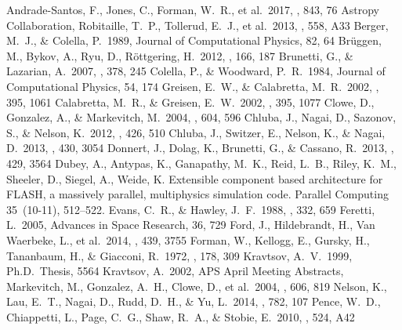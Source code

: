 \documentclass{emulateapj}
\begin{document}
\begin{thebibliography}{}
 Andrade-Santos, F., Jones, C., Forman, W.~R., et al.\ 2017, \apj, 843, 76 
 Astropy Collaboration, Robitaille, T.~P., Tollerud, E.~J., et al.\ 2013, \aap, 558, A33
 Berger, M.~J., \& Colella, P.\ 1989, Journal of Computational Physics, 82, 64
 Br{\"u}ggen, M., Bykov, A., Ryu, D., R{\"o}ttgering, H.\ 2012, \ssr, 166, 187
 Brunetti, G., \& Lazarian, A.\ 2007, \mnras, 378, 245
 Colella, P., \& Woodward, P.~R.\ 1984, Journal of Computational Physics, 54, 174
 Greisen, E.~W., \& Calabretta, M.~R.\ 2002, \aap, 395, 1061
 Calabretta, M.~R., \& Greisen, E.~W.\ 2002, \aap, 395, 1077
 Clowe, D., Gonzalez, A., \& Markevitch, M.\ 2004, \apj, 604, 596
 Chluba, J., Nagai, D., Sazonov, S., \& Nelson, K.\ 2012, \mnras, 426, 510
 Chluba, J., Switzer, E., Nelson, K., \& Nagai, D.\ 2013, \mnras, 430, 3054
 Donnert, J., Dolag, K., Brunetti, G., \& Cassano, R.\ 2013, \mnras, 429, 3564
 {Dubey}, A., {Antypas}, K.,
  {Ganapathy}, M.~K., {Reid}, L.~B., {Riley}, K.~M., {Sheeler}, D.,
  {Siegel}, A., {Weide}, K. Extensible component based architecture
  for FLASH, a massively parallel, multiphysics simulation
  code. Parallel Computing 35~(10-11), 512--522.
 Evans, C.~R., \& Hawley, J.~F.\ 1988, \apj, 332, 659
 Feretti, L.\ 2005, Advances in Space Research, 36, 729
 Ford, J., Hildebrandt, H., Van Waerbeke, L., et al.\ 2014, \mnras, 439, 3755
 Forman, W., Kellogg, E., Gursky, H., Tananbaum, H., \& Giacconi, R.\ 1972, \apj, 178, 309
 Kravtsov, A.~V.\ 1999, Ph.D.~Thesis, 5564 
 Kravtsov, A.\ 2002, APS April Meeting Abstracts,  
 Markevitch, M., Gonzalez, A.~H., Clowe, D., et al.\ 2004, \apj, 606, 819
 Nelson, K., Lau, E.~T., Nagai, D., Rudd, D.~H., \& Yu, L.\ 2014, \apj, 782, 107 
 Pence, W.~D., Chiappetti, L., Page, C.~G., Shaw, R.~A., \& Stobie, E.\ 2010, \aap, 524, A42

\end{thebibliography}
\end{document}
